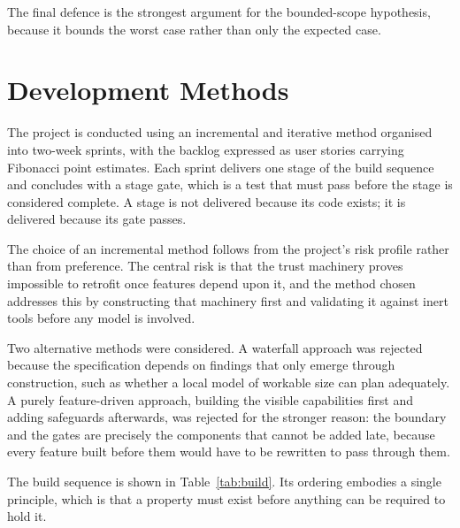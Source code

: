 \documentclass{FastFyp}
\begin{document}
The final defence is the strongest argument for the bounded-scope hypothesis, because it bounds the worst case rather than only the expected case.

\section{Development Methods}
The project is conducted using an incremental and iterative method organised into two-week sprints, with the backlog expressed as user stories carrying Fibonacci point estimates. Each sprint delivers one stage of the build sequence and concludes with a stage gate, which is a test that must pass before the stage is considered complete. A stage is not delivered because its code exists; it is delivered because its gate passes.

The choice of an incremental method follows from the project's risk profile rather than from preference. The central risk is that the trust machinery proves impossible to retrofit once features depend upon it, and the method chosen addresses this by constructing that machinery first and validating it against inert tools before any model is involved.

Two alternative methods were considered. A waterfall approach was rejected because the specification depends on findings that only emerge through construction, such as whether a local model of workable size can plan adequately. A purely feature-driven approach, building the visible capabilities first and adding safeguards afterwards, was rejected for the stronger reason: the boundary and the gates are precisely the components that cannot be added late, because every feature built before them would have to be rewritten to pass through them.

The build sequence is shown in Table~\ref{tab:build}. Its ordering embodies a single principle, which is that a property must exist before anything can be required to hold it.
\end{document}
